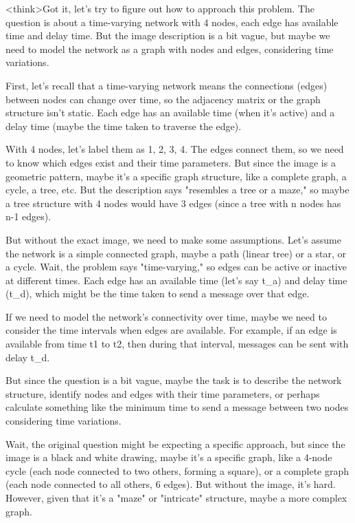 <think>Got it, let's try to figure out how to approach this problem. The question is about a time-varying network with 4 nodes, each edge has available time and delay time. But the image description is a bit vague, but maybe we need to model the network as a graph with nodes and edges, considering time variations. 

First, let's recall that a time-varying network means the connections (edges) between nodes can change over time, so the adjacency matrix or the graph structure isn't static. Each edge has an available time (when it's active) and a delay time (maybe the time taken to traverse the edge). 

With 4 nodes, let's label them as 1, 2, 3, 4. The edges connect them, so we need to know which edges exist and their time parameters. But since the image is a geometric pattern, maybe it's a specific graph structure, like a complete graph, a cycle, a tree, etc. But the description says "resembles a tree or a maze," so maybe a tree structure with 4 nodes would have 3 edges (since a tree with n nodes has n-1 edges). 

But without the exact image, we need to make some assumptions. Let's assume the network is a simple connected graph, maybe a path (linear tree) or a star, or a cycle. Wait, the problem says "time-varying," so edges can be active or inactive at different times. Each edge has an available time (let's say t_a) and delay time (t_d), which might be the time taken to send a message over that edge. 

If we need to model the network's connectivity over time, maybe we need to consider the time intervals when edges are available. For example, if an edge is available from time t1 to t2, then during that interval, messages can be sent with delay t_d. 

But since the question is a bit vague, maybe the task is to describe the network structure, identify nodes and edges with their time parameters, or perhaps calculate something like the minimum time to send a message between two nodes considering time variations. 

Wait, the original question might be expecting a specific approach, but since the image is a black and white drawing, maybe it's a specific graph, like a 4-node cycle (each node connected to two others, forming a square), or a complete graph (each node connected to all others, 6 edges). But without the image, it's hard. However, given that it's a "maze" or "intricate" structure, maybe a more complex graph. 

